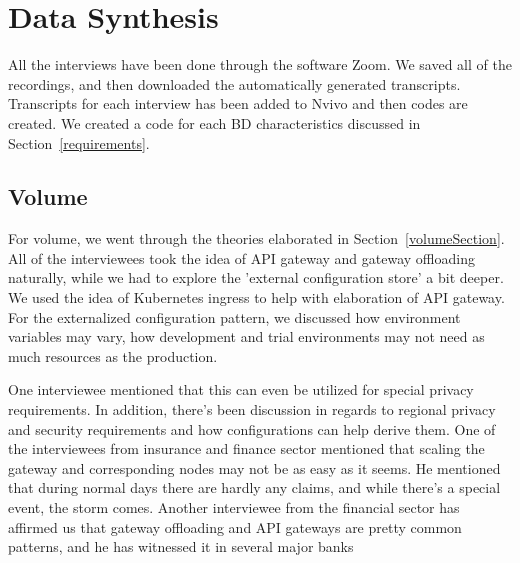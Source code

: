 \documentclass[a4paper,11pt,article,oneside]{memoir}
\begin{document}

\section{Data Synthesis}

All the interviews have been done through the software Zoom. We saved all of the recordings, and then downloaded the automatically generated transcripts. Transcripts for each interview has been added to Nvivo and then codes are created. We created a code for each BD characteristics discussed in Section~\ref{requirements}. 


\subsection{Volume}

For volume, we went through the theories elaborated in Section~\ref{volumeSection}. All of the interviewees took the idea of API gateway and gateway offloading naturally, while we had to explore the 'external configuration store' a bit deeper. We used the idea of Kubernetes ingress to help with elaboration of API gateway. For the externalized configuration pattern, we discussed how environment variables may vary, how development and trial environments may not need as much resources as the production.


One interviewee mentioned that this can even be utilized for special privacy requirements. In addition, there's been discussion in regards to regional privacy and security requirements and how configurations can help derive them. One of the interviewees from insurance and finance sector mentioned that scaling the gateway and corresponding nodes may not be as easy as it seems. He mentioned that during normal days there are hardly any claims, and while there's a special event, the storm comes.  Another interviewee from the financial sector has affirmed us that gateway offloading and API gateways are pretty common patterns, and he has witnessed it in several major banks
\end{document}
